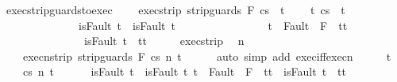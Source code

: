 \begin{isabellebody}
\isamarkupfalse%
%
\endisatagproof
{\isafoldproof}%
%
\isadelimproof
\isanewline
%
\endisadelimproof
\isanewline
{}\isamarkupfalse%
\ exec{\isacharunderscore}strip{\isacharunderscore}guards{\isacharunderscore}to{\isacharunderscore}exec{\isacharcolon}\ \isanewline
\ \ \ exec{\isacharunderscore}strip{\isacharcolon}\ {\isachardoublequoteopen}{\isasymGamma}{\isasymturnstile}{\isasymlangle}strip{\isacharunderscore}guards\ F\ c{\isacharcomma}s{\isasymrangle}\ {\isasymRightarrow}\ t{\isachardoublequoteclose}\ \isanewline
\ \ \ {\isachardoublequoteopen}{\isasymexists}t{\isacharprime}{\isachardot}\ {\isasymGamma}{\isasymturnstile}{\isasymlangle}c{\isacharcomma}s{\isasymrangle}\ {\isasymRightarrow}\ t{\isacharprime}\ {\isasymand}\ \isanewline
\ \ \ \ \ \ \ \ \ \ \ \ \ \ {\isacharparenleft}isFault\ t\ {\isasymlongrightarrow}\ isFault\ t{\isacharprime}{\isacharparenright}\ {\isasymand}\ \isanewline
\ \ \ \ \ \ \ \ \ \ \ \ \ \ {\isacharparenleft}t{\isacharprime}\ {\isasymin}\ Fault\ {\isacharbackquote}\ {\isacharparenleft}{\isacharminus}F{\isacharparenright}\ {\isasymlongrightarrow}\ t{\isacharprime}{\isacharequal}t{\isacharparenright}\ {\isasymand}\isanewline
\ \ \ \ \ \ \ \ \ \ \ \ \ \ {\isacharparenleft}{\isasymnot}\ isFault\ t{\isacharprime}\ {\isasymlongrightarrow}\ t{\isacharprime}{\isacharequal}t{\isacharparenright}{\isachardoublequoteclose}\isanewline
%
\isadelimproof
%
\endisadelimproof
%
\isatagproof
{}\isamarkupfalse%
\ {\isacharminus}\isanewline
\ \ \isamarkupfalse%
\ exec{\isacharunderscore}strip\ \isamarkupfalse%
\ n\ \ \isanewline
\ \ \ \ execn{\isacharunderscore}strip{\isacharcolon}\ {\isachardoublequoteopen}{\isasymGamma}{\isasymturnstile}{\isasymlangle}strip{\isacharunderscore}guards\ F\ c{\isacharcomma}s{\isasymrangle}\ {\isacharequal}n{\isasymRightarrow}\ t{\isachardoublequoteclose}\isanewline
\ \ \ \ \isamarkupfalse%
\ {\isacharparenleft}auto\ simp\ add{\isacharcolon}\ exec{\isacharunderscore}iff{\isacharunderscore}execn{\isacharparenright}\isanewline
\ \ \isamarkupfalse%
\ \isamarkupfalse%
\ t{\isacharprime}\ \isanewline
\ \ \ \ {\isachardoublequoteopen}{\isasymGamma}{\isasymturnstile}{\isasymlangle}c{\isacharcomma}s{\isasymrangle}\ {\isacharequal}n{\isasymRightarrow}\ t{\isacharprime}{\isachardoublequoteclose}\ \ \isanewline
\ \ \ \ {\isachardoublequoteopen}isFault\ t\ {\isasymlongrightarrow}\ isFault\ t{\isacharprime}{\isachardoublequoteclose}\ {\isachardoublequoteopen}t{\isacharprime}\ {\isasymin}\ Fault\ {\isacharbackquote}\ {\isacharparenleft}{\isacharminus}F{\isacharparenright}\ {\isasymlongrightarrow}\ t{\isacharprime}{\isacharequal}t{\isachardoublequoteclose}\ {\isachardoublequoteopen}{\isasymnot}\ isFault\ t{\isacharprime}\ {\isasymlongrightarrow}\ t{\isacharprime}{\isacharequal}t{\isachardoublequoteclose}\isanewline

\end{isabellebody}
